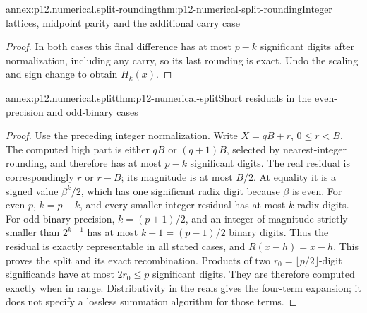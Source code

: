 \begin{annexitem}{annex:p12.numerical.split-rounding}{thm:p12-numerical-split-rounding}{Integer lattices, midpoint parity and the additional carry case}
\begin{proof}
In both cases this final difference has at most \(p-k\) significant
digits after normalization, including any carry, so its last rounding
is exact. Undo the scaling and sign change to obtain \(H_k(x)\).
\end{proof}
\end{annexitem}

\begin{annexitem}{annex:p12.numerical.split}{thm:p12-numerical-split}{Short residuals in the even-precision and odd-binary cases}
\begin{proof}
Use the preceding integer normalization. Write
\(X=qB+r\), \(0\leq r<B\). The computed high part is either
\(qB\) or \((q+1)B\), selected by nearest-integer rounding, and
therefore has at most \(p-k\) significant digits. The real residual
is correspondingly \(r\) or \(r-B\); its magnitude is at most
\(B/2\). At equality it is a signed value \(\beta^k/2\), which
has one significant radix digit because \(\beta\) is even.
For even \(p\), \(k=p-k\), and every smaller integer residual has
at most \(k\) radix digits. For odd binary precision,
\(k=(p+1)/2\), and an integer of magnitude strictly smaller than
\(2^{k-1}\) has at most \(k-1=(p-1)/2\) binary digits. Thus
the residual is exactly representable in all stated cases, and
\(R(x-h)=x-h\). This proves the split and its exact recombination.
Products of two \(r_0=\lfloor p/2\rfloor\)-digit significands
have at most \(2r_0\leq p\) significant digits. They are therefore
computed exactly when in range. Distributivity in the reals gives
the four-term expansion; it does not specify a lossless summation
algorithm for those terms.
\end{proof}
\end{annexitem}

